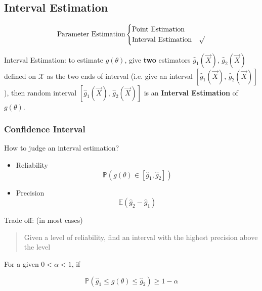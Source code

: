 \subsection{Interval Estimation}\label{SectionIntervalEstimation}
\begin{equation}
    \text{Parameter Estimation}\begin{cases}
        \text{Point Estimation}& \\
        \text{Interval Estimation}& \surd
    \end{cases}    
\end{equation}

    Interval Estimation: to estimate $g(\theta)$, give \textbf{two} estimators $\hat{g}_1(\vec{X}),\, \hat{g}_2(\vec{X})$ defined on $\mathscr{X}$ as the two ends of interval (i.e. give an interval $[\hat{g}_1(\vec{X}),\, \hat{g}_2(\vec{X})]$), then random interval $[\hat{g}_1(\vec{X}),\, \hat{g}_2(\vec{X})]$ is an \textbf{Interval Estimation} of $g(\theta)$.

    \subsubsection{Confidence Interval}\label{SubSectionConfidenceInterval}
    How to judge an interval estimation?
    \begin{itemize}
        \item Reliability
        \begin{equation}\mathbb{P}(g(\theta)\in[\hat{g}_1,\hat{g}_2])\end{equation}
        \item Precision
        \begin{equation}\mathbb{E}(\hat{g}_2-\hat{g}_1)\end{equation}
    \end{itemize}

    Trade off: (in most cases)
    \begin{quote}
        Given a level of reliability, find an interval with the highest precision above the level
    \end{quote}

\begin{point}
    For a given $0<\alpha<1$, if 
\end{point}

    \begin{equation}
        \mathbb{P}(\hat{g}_1\leq g(\theta)\leq \hat{g}_2)\geq 1-\alpha
    \end{equation}


